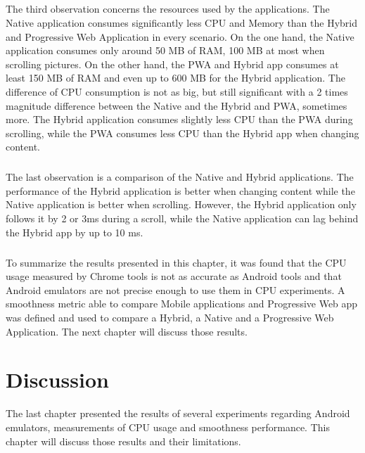 \documentclass{kththesis}
\begin{document}
\paragraph{}
The third observation concerns the resources used by the applications. The Native application consumes significantly less CPU and Memory than the Hybrid and Progressive Web Application in every scenario. On the one hand, the Native application consumes only around 50 MB of RAM, 100 MB at most when scrolling pictures. On the other hand, the PWA and Hybrid app consumes at least 150 MB of RAM and even up to 600 MB for the Hybrid application.  \newline
The difference of CPU consumption is not as big, but still significant with a 2 times magnitude difference between the Native and the Hybrid and PWA, sometimes more. The Hybrid application consumes slightly less CPU than the PWA during scrolling, while the PWA consumes less CPU than the Hybrid app when changing content. 

\paragraph{}
The last observation is a comparison of the Native and Hybrid applications. The performance of the Hybrid application is better when changing content while the Native application is better when scrolling. However, the Hybrid application only follows it by 2 or 3ms during a scroll, while the Native application can lag behind the Hybrid app by up to 10 ms. 

\paragraph{}
To summarize the results presented in this chapter, it was found that the CPU usage measured by Chrome tools is not as accurate as Android tools and that Android emulators are not precise enough to use them in CPU experiments. A smoothness metric able to compare Mobile applications and Progressive Web app was defined and used to compare a Hybrid, a Native and a Progressive Web Application. The next chapter will discuss those results.


\chapter{Discussion}

The last chapter presented the results of several experiments regarding Android emulators, measurements of CPU usage and smoothness performance. This chapter will discuss those results and their limitations.
\end{document}
